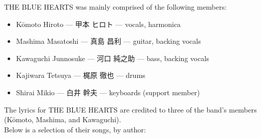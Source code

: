 THE BLUE HEARTS was mainly comprised of the following members:
\begin{itemize}
	\item Kōmoto Hiroto --- 甲本 ヒロト --- vocals, harmonica
	\item Mashima Masatoshi --- 真島 昌利 --- guitar, backing vocals
	\item Kawaguchi Junnosuke --- 河口 純之助 --- bass, backing vocals
	\item Kajiwara Tetsuya --- 梶原 徹也 --- drums
	\item Shirai Mikio --- 白井 幹夫 --- keyboards (support member)
\end{itemize}

\bigskip

The lyrics for THE BLUE HEARTS are credited to three of the band's members (Kōmoto, Mashima, and Kawaguchi). \\

Below is a selection of their songs, by author:

